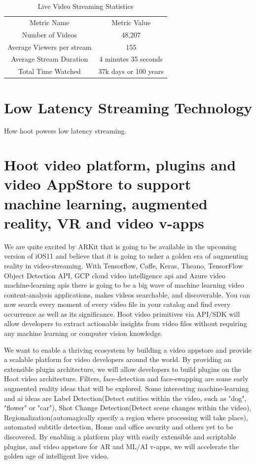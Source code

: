 \documentclass{article}
\begin{document}
\begin{table}[!htb]
\centering
\begin{tabular}{ |c|c| }
\hline
\rowcolor{lightgray} \multicolumn{2}{|c|}{Live Video Streaming Statistics} \\
\hline
Metric Name & Metric Value  \\
\hline
Number of Videos & 48,207 \\
Average Viewers per stream & 155 \\
Average Stream Duration & 4 minutes 35 seconds \\
Total Time Watched & 37k days or 100 years \\
\hline
\end{tabular}
\caption{Live Video Streaming Statistics}
\label{table:2}
\end{table}



\section{Low Latency Streaming Technology}
How hoot powers low latency streaming.



\section{Hoot video platform, plugins and video AppStore to support machine learning,
  augmented reality, VR and video v-apps}
We are quite excited by ARKit that is going to be available in the
upcoming version of iOS11 and believe that it is going to usher a
golden era of augmenting reality in video-streaming. With Tensorflow,
Caffe, Keras, Theano, TensorFlow Object Detection API, GCP cloud
video intelligence api and Azure video machine-learning apis there is going to be a
big wave of machine learning video content-analysis applications,
makes videos searchable, and discoverable. You can now search every
moment of every video file in your catalog and find every occurrence
as well as its significance. Hoot video primitives via API/SDK will allow developers to extract
actionable insights from video files without requiring any machine
learning or computer vision knowledge. 

 We want to enable a
thriving ecosystem by building a video appstore and provide a scalable
platform for video developers around the world. By providing an
extensible plugin architecture, we will allow developers to build
plugins on the Hoot video architecture. Filters, face-detection and face-swapping
are some early augmented reality ideas that will be explored. Some interesting
machine-learning and ai ideas are Label Detection(Detect entities
within the video, such as "dog", "flower" or "car"), Shot Change
Detection(Detect scene changes within the video),
Regionalization(automagically specify a region where processing will
take place), automated subtitle detection, Home and office security and others yet to be discovered. By enabling a platform
play with easily extensible and scriptable plugins, and video appstore
for AR and ML/AI v-apps, we will accelerate the golden age of
intelligent live video.
\end{document}
